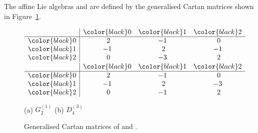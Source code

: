 \documentclass[pdftex]{sigma}
\numberwithin{equation}{section}
\theoremstyle{definition}
\begin{document}
The affine Lie algebras  and  are defined by the generalised Cartan matrices shown in Figure~\ref{fig:CMs}.

\begin{figure}[!t]
 \centering
$\begin{array}{c|ccc}
& {\color{black}0} & {\color{black}1} & {\color{black}2} \\
\hline
 {\color{black}0} & \,\,2 & -1 & \,\,0 \\
 {\color{black}1} & -1 & \,\,2 & -1 \\
 {\color{black}2} & \,\,0 & -3 & \,\,2
\end{array}$ \qquad
$\begin{array}{c|ccc}
& {\color{black}0} & {\color{black}1} & {\color{black}2} \\
\hline
 {\color{black}0} & \,\,2 & -1 & \,\,0 \\
 {\color{black}1} & -1 & \,\,2 & -3 \\
 {\color{black}2} & \,\,0 & -1 & \,\,2
\end{array}$

\vspace{1mm}

(a) $G_2^{(1)}$ \hspace{25mm} (b) $D_4^{(3)}$

\vspace{2mm}

 \caption{Generalised Cartan matrices of  and .}
 \label{fig:CMs}
\end{figure}
\end{document}
